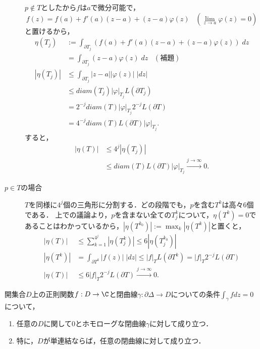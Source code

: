 \documentclass[uplatex, dvipdfmx]{jsreport}
\begin{document}
\begin{Proof}
\begin{description}
        $p\notin T$としたから$f$は$a$で微分可能で，
        \[ f(z)=f(a)+f'(a)(z-a)+(z-a)\varphi(z)\;\;\;(\lim_{z\to a}\varphi(z)=0) \]
        と置けるから，
        \begin{align*}
            \eta(T_j)&:=\int_{\partial T_j}(f(a)+f'(a)(z-a)+(z-a)\varphi(z))\;dz\\
            &=\int_{\partial T_j}(z-a)\varphi(z)\;dz\;\;\;(補題)\\
            |\eta(T_j)|&\le\int_{\partial T_j}|z-a||\varphi(z)|\;|dz|\\
            &\le diam(T_j)|\varphi|_{T_j}L(\partial T_j)\\
            &= 2^{-j}diam(T)|\varphi|_{T_j}2^{-j}L(\partial T)\\
            &= 4^{-j}diam(T)L(\partial T)|\varphi|_{T_j}.
        \end{align*}
        すると，
        \begin{align*}
            |\eta(T)|&\le 4^j|\eta(T_j)|\\
            &\le diam(T)L(\partial T)|\varphi|_{T_j}\xrightarrow{j\to\infty}0.
        \end{align*}
        \item[$p\in T$の場合] $T$を同様に$4^j$個の三角形に分割する．どの段階でも，$p$を含む$T^k$は高々$6$個である．
        上での議論より，$p$を含まない全ての$T^k_j$について，$\eta(T^k)=0$であることはわかっているから，$|\eta(T^{k_0})|:=\max_{k}|\eta(T^k)|$と置くと，
        \begin{align*}
            |\eta(T)|&\le\sum^{4^j}_{k=1}|\eta(T^k_j)|\le 6|\eta(T^{k_0}_j)|\\
            |\eta(T^k)|&=\int_{\partial T^k}|f(z)|\;|dz|\le|f|_TL(\partial T^k)=|f|_T2^{-j}L(\partial T)\\
            |\eta(T)|&\le 6|f|_T2^{-j}L(\partial T)\xrightarrow{j\to\infty}0.
        \end{align*}
    \end{description}
\end{Proof}

\begin{theorem}[ホモロジーの言葉によるCauchyの定理]\label{thm-Cauchy}
    開集合$D$上の正則関数$f:D\to\C$と閉曲線$\gamma:\partial\Delta\to D$についての条件$\int_\gamma fdz=0$について，
    \begin{enumerate}
        \item 任意の$D$に関して$0$とホモローグな閉曲線$\gamma$に対して成り立つ．
        \item 特に，$D$が単連結ならば，任意の閉曲線に対して成り立つ．
    \end{enumerate}
\end{theorem}
\end{document}
